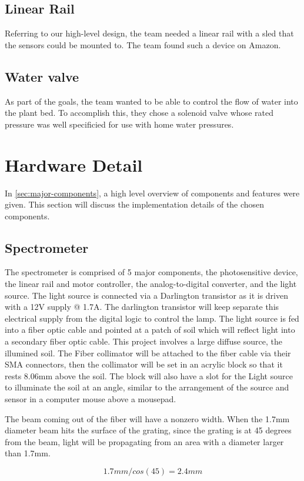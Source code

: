 \documentclass[journal]{IEEEtran}
\begin{document}
\subsection{Linear Rail}
Referring to our high-level design, the team needed a linear rail with a sled that the sensors could be mounted to.
The team found such a device on Amazon.
\subsection{Water valve}
As part of the goals, the team wanted to be able to control the flow of water
into the plant bed. To accomplish this, they chose a solenoid valve whose rated pressure was well specificied for use with home water pressures.
\section{Hardware Detail}
In \autoref{sec:major-components}, a high level overview of components and features were given. This
section will discuss the implementation details of the chosen components.
\subsection{Spectrometer}
The spectrometer is comprised of 5 major components, the photosensitive device, the linear rail and motor controller, the analog-to-digital converter, and the light source. The light source is connected via a Darlington transistor as it is driven with a 12V supply @ 1.7A. The darlington transistor will keep separate this electrical supply from the digital logic to control the lamp. The light source is fed into a fiber optic cable and pointed at a patch of soil which will reflect light into a secondary fiber optic cable.
This project involves a large diffuse source, the illumined soil. The Fiber collimator will be attached to the fiber cable via their SMA connectors, then the collimator will be set in an acrylic block so that it rests 8.06mm above the soil. The block will also have a slot for the Light source to illuminate the soil at an angle, similar to the arrangement of the source and sensor in a computer mouse above a mousepad.

The beam coming out of the fiber will have a nonzero width. When the 1.7mm diameter beam hits the surface of the grating, since the grating is at 45 degrees from the beam, light will be propagating from an area with a diameter larger than 1.7mm.

\begin{equation}
    1.7mm/cos(45) = 2.4mm
\end{equation}
\end{document}

